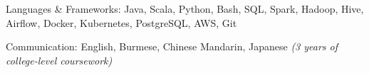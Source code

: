 

\begin{cvskills}

  \cvskill
    {Languages \& Frameworks:} %
    {Java, Scala, Python, Bash, SQL, Spark, Hadoop, Hive, Airflow, Docker, Kubernetes, PostgreSQL, AWS, Git} %

  \cvskill
    {Communication:} %
    {English, Burmese, Chinese Mandarin, Japanese \bodyfontlight\emph{(3 years of college-level coursework)}} %

\end{cvskills}
